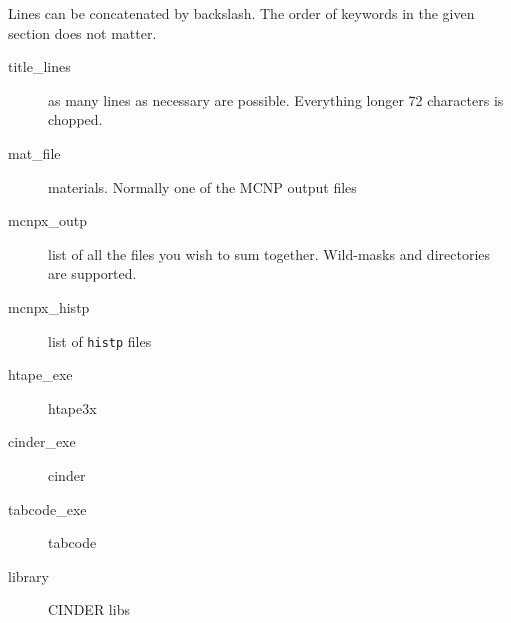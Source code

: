 Lines can be concatenated by backslash. The order of keywords in the given section does not matter.

\begin{description}
  \item[title\_lines] as many lines as necessary are possible. Everything longer 72 characters is chopped.
  \item[mat\_file] materials. Normally one of the MCNP output files
   \item[mcnpx\_outp] list of all the files you wish to sum together. Wild-masks and directories are supported.
   \item[mcnpx\_histp] list of {\tt histp} files
   \item[htape\_exe] htape3x
   \item[cinder\_exe] cinder
   \item[tabcode\_exe] tabcode
   \item[library] CINDER libs
\end{description}